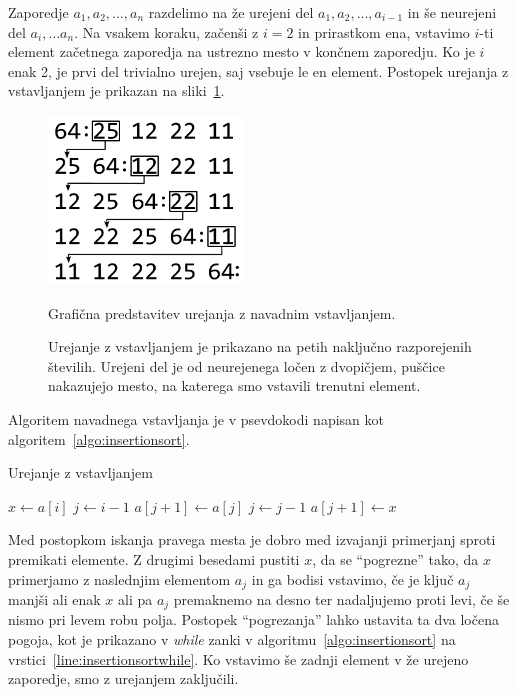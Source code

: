 \documentclass[a4paper,oneside,12pt]{article}
\begin{document}
Zaporedje $a_1, a_2, \ldots, a_n$ razdelimo na že urejeni del $a_1, a_2, \ldots, a_{i-1}$
in še neurejeni del $a_i, \ldots a_n$. Na vsakem koraku, začenši z $i = 2$ in
prirastkom ena, vstavimo $i$-ti element začetnega zaporedja na ustrezno mesto v končnem
zaporedju. Ko je $i$ enak 2, je prvi del trivialno urejen, saj vsebuje le en element.
Postopek urejanja z vstavljanjem je prikazan na
sliki~\ref{fig:insertionsortimage}.

\begin{figure}[ht]
    \begin{center}
        \includegraphics[height=45mm]{slike/insertionsort.pdf}
    \end{center}
    \vspace{-0.7cm}
    \caption[Urejanje z vstavljanjem]{Grafična predstavitev urejanja z navadnim
    vstavljanjem.}
    \caption*{{ \small Urejanje z vstavljanjem je prikazano 
    na petih naključno razporejenih številih.
    Urejeni del je od neurejenega ločen z dvopičjem, puščice nakazujejo mesto,
    na katerega smo vstavili trenutni element.}}
    \label{fig:insertionsortimage}
\end{figure}

Algoritem navadnega vstavljanja je v psevdokodi napisan kot algoritem~\ref{algo:insertionsort}.

\begin{algorithm}[h!t!]
  \caption{Urejanje z vstavljanjem}\label{algo:insertionsort}
  \begin{algorithmic}[1]
            \State $x \gets a[i]$
            \State $j \gets i - 1$
             \label{line:insertionsortwhile} 
                \State $a[j+1] \gets a[j]$
                \State $j \gets j - 1$
            \EndWhile
            \State $a[j+1] \gets x$
        \EndFor
    \EndFunction
  \end{algorithmic}
\end{algorithm}

Med postopkom iskanja pravega mesta je dobro med izvajanji primerjanj 
sproti premikati elemente. Z drugimi besedami pustiti $x$, da se ``pogrezne'' tako, da $x$
primerjamo z naslednjim elementom $a_j$ in ga bodisi vstavimo, če je ključ $a_j$ manjši
ali enak $x$ ali pa $a_j$ premaknemo na desno ter nadaljujemo proti levi, če še nismo pri
levem robu polja. Postopek ``pogrezanja'' lahko ustavita ta dva ločena
pogoja, kot je prikazano v \emph{while} zanki v
algoritmu~\ref{algo:insertionsort} na vrstici~\ref{line:insertionsortwhile}.  Ko vstavimo še zadnji element v že 
urejeno zaporedje, smo z urejanjem zaključili.
\end{document}

